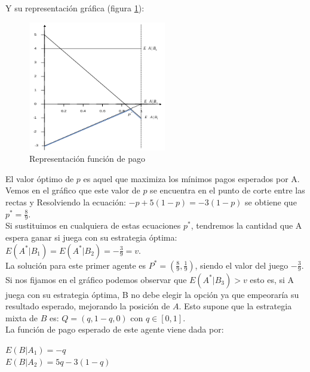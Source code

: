 \begin{enumerate}
Y su representación gráfica (figura \ref{fig:func_pago}):
\\
\begin{figure}[h]
     \begin{center}
         \includegraphics[width=60mm]{chapters/chapter5/figures/Picture1.png}
     \end{center}
     \caption{Representación función de pago}
\label{fig:func_pago}
\end{figure}
El valor óptimo de $p$ es aquel que maximiza los mínimos pagos esperados  por A. Vemos en el gráfico que este valor de $p$ se encuentra en el punto de corte entre las rectas  y  Resolviendo la ecuación: $-p+5(1-p)=-3(1-p)$ se obtiene que $p^*=\frac{8}{9}$.
\\
Si sustituimos en cualquiera de estas ecuaciones $p^*$, tendremos la cantidad que A espera ganar si juega con su estrategia óptima: $E(A^*|B_1)=E(A^*|B_2)=-\frac{3}{9}=v$. 
\\
\vspace{2mm}
La solución para este primer agente es $P^*=(\frac{8}{9},\frac{1}{9})$, siendo el valor del juego $-\frac{3}{9}$.
\\
\vspace{2mm}
Si nos fijamos en el gráfico podemos observar que $E(A^*|B_3)>v$ esto es, si A juega con su estrategia óptima, B no debe elegir la opción  ya que empeoraría su resultado esperado, mejorando la posición de $A$. Esto supone que la estrategia mixta de $B$ es: $Q=(q,1-q,0)$ con $q \in [0,1]$. 
\\
La función de pago esperado de este agente viene dada por:
\begin{center}
    $E(B|A_1)=-q$\\
    $E(B|A_2)=5q-3(1-q)$\\
\end{center}


\end{enumerate}
